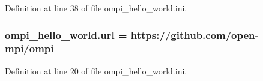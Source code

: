 Definition at line 38 of file ompi\-\_\-hello\-\_\-world.\-ini.

\hypertarget{namespaceompi__hello__world_ae0dcf6cc43abc8d11428686639a5059a}{
\subsubsection[{url}]{\setlength{\rightskip}{0pt plus 5cm}ompi\-\_\-hello\-\_\-world.\-url = https\-://github.\-com/open-\/mpi/ompi}}\label{namespaceompi__hello__world_ae0dcf6cc43abc8d11428686639a5059a}


Definition at line 20 of file ompi\-\_\-hello\-\_\-world.\-ini.

